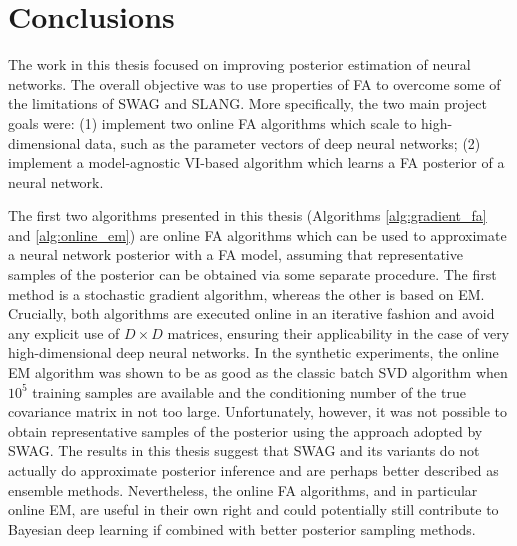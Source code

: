 \documentclass[msc,deptreport.inf]{infthesis} %
\begin{document}
\chapter{Conclusions}\label{ch:conclusions}


%

The work in this thesis focused on improving posterior estimation of neural networks. The overall objective was to use properties of FA to overcome some of the limitations of SWAG and SLANG. More specifically, the two main project goals were: (1) implement two online FA algorithms which scale to high-dimensional data, such as the parameter vectors of deep neural networks; (2) implement a model-agnostic VI-based algorithm which learns a FA posterior of a neural network. 

The first two algorithms presented in this thesis (Algorithms \ref{alg:gradient_fa} and \ref{alg:online_em}) are online FA algorithms which can be used to approximate a neural network posterior with a FA model, assuming that representative samples of the posterior can be obtained via some separate procedure. The first method is a stochastic gradient algorithm, whereas the other is based on EM. Crucially, both algorithms are executed online in an iterative fashion and avoid any explicit use of $D \times D$ matrices, ensuring their applicability in the case of very high-dimensional deep neural networks. In the synthetic experiments, the online EM algorithm was shown to be as good as the classic batch SVD algorithm when $10^5$ training samples are available and the conditioning number of the true covariance matrix in not too large. Unfortunately, however, it was not possible to obtain representative samples of the posterior using the approach adopted by SWAG. The results in this thesis suggest that SWAG and its variants do not actually do approximate posterior inference and are perhaps better described as ensemble methods. Nevertheless, the online FA algorithms, and in particular online EM, are useful in their own right and could potentially still contribute to Bayesian deep learning if combined with better posterior sampling methods. 
\end{document}
